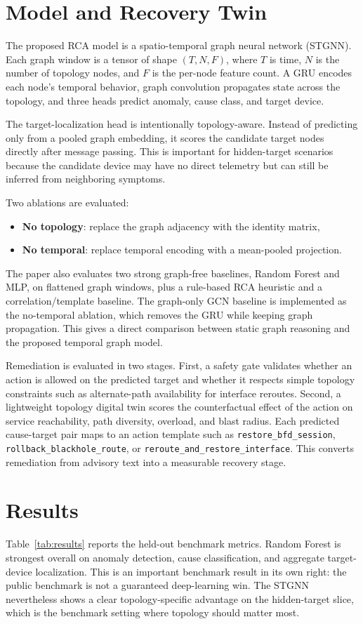\documentclass[conference]{IEEEtran}
\begin{document}
\section{Model and Recovery Twin}
The proposed RCA model is a spatio-temporal graph neural network (STGNN). Each graph window is a tensor of shape \((T, N, F)\), where \(T\) is time, \(N\) is the number of topology nodes, and \(F\) is the per-node feature count. A GRU encodes each node's temporal behavior, graph convolution propagates state across the topology, and three heads predict anomaly, cause class, and target device.

The target-localization head is intentionally topology-aware. Instead of predicting only from a pooled graph embedding, it scores the candidate target nodes directly after message passing. This is important for hidden-target scenarios because the candidate device may have no direct telemetry but can still be inferred from neighboring symptoms.

Two ablations are evaluated:
\begin{itemize}
\item \textbf{No topology}: replace the graph adjacency with the identity matrix,
\item \textbf{No temporal}: replace temporal encoding with a mean-pooled projection.
\end{itemize}

The paper also evaluates two strong graph-free baselines, Random Forest and MLP, on flattened graph windows, plus a rule-based RCA heuristic and a correlation/template baseline. The graph-only GCN baseline is implemented as the no-temporal ablation, which removes the GRU while keeping graph propagation. This gives a direct comparison between static graph reasoning and the proposed temporal graph model.

Remediation is evaluated in two stages. First, a safety gate validates whether an action is allowed on the predicted target and whether it respects simple topology constraints such as alternate-path availability for interface reroutes. Second, a lightweight topology digital twin scores the counterfactual effect of the action on service reachability, path diversity, overload, and blast radius. Each predicted cause-target pair maps to an action template such as \texttt{restore\_bfd\_session}, \texttt{rollback\_blackhole\_route}, or \texttt{reroute\_and\_restore\_interface}. This converts remediation from advisory text into a measurable recovery stage.

\section{Results}
Table~\ref{tab:results} reports the held-out benchmark metrics. Random Forest is strongest overall on anomaly detection, cause classification, and aggregate target-device localization. This is an important benchmark result in its own right: the public benchmark is not a guaranteed deep-learning win. The STGNN nevertheless shows a clear topology-specific advantage on the hidden-target slice, which is the benchmark setting where topology should matter most.
\end{document}
